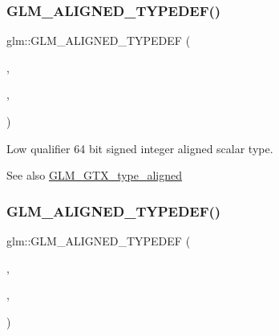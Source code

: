 \subsubsection{\texorpdfstring{G\+L\+M\+\_\+\+A\+L\+I\+G\+N\+E\+D\+\_\+\+T\+Y\+P\+E\+D\+E\+F()}{GLM\_ALIGNED\_TYPEDEF()}\hspace{0.1cm}{\footnotesize\ttfamily [4/209]}}
{\footnotesize\ttfamily glm\+::\+G\+L\+M\+\_\+\+A\+L\+I\+G\+N\+E\+D\+\_\+\+T\+Y\+P\+E\+D\+EF (\begin{DoxyParamCaption}\item[{\hyperlink{group__gtc__type__precision_gab8a8e75af347592406e41b3ae2c0712b}{lowp\+\_\+int64}}]{,  }\item[{aligned\+\_\+lowp\+\_\+int64}]{,  }\item[{8}]{ }\end{DoxyParamCaption})}

Low qualifier 64 bit signed integer aligned scalar type. \begin{DoxySeeAlso}{See also}
\hyperlink{group__gtx__type__aligned}{G\+L\+M\+\_\+\+G\+T\+X\+\_\+type\+\_\+aligned} 
\end{DoxySeeAlso}
\mbox{\label{group__gtx__type__aligned_ga7ddc1848ff2223026db8968ce0c97497}} 
\subsubsection{\texorpdfstring{G\+L\+M\+\_\+\+A\+L\+I\+G\+N\+E\+D\+\_\+\+T\+Y\+P\+E\+D\+E\+F()}{GLM\_ALIGNED\_TYPEDEF()}\hspace{0.1cm}{\footnotesize\ttfamily [5/209]}}
{\footnotesize\ttfamily glm\+::\+G\+L\+M\+\_\+\+A\+L\+I\+G\+N\+E\+D\+\_\+\+T\+Y\+P\+E\+D\+EF (\begin{DoxyParamCaption}\item[{\hyperlink{group__gtc__type__precision_gae6092311f6970a305c2df19a372360a3}{lowp\+\_\+int8\+\_\+t}}]{,  }\item[{aligned\+\_\+lowp\+\_\+int8\+\_\+t}]{,  }\item[{1}]{ }\end{DoxyParamCaption})}

